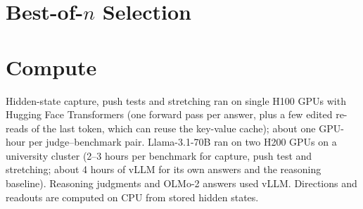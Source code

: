 \begin{table}[h]
\centering
\small

\caption{Same-model pairs on questions the judge cannot solve, per judge: ranking ($\times$100) by each readout. Groups: questions with at least one right and one wrong answer from the same answering model.}
\label{tab:smpairs}
\end{table}

\section{Best-of-$n$ Selection}
\label{app:bon}

\begin{table}[h]
\centering
\small

\caption{Best-of-$n$ accuracy: the share of groups (questions; question $\times$ answering model for same-model sets; only groups with at least one right and one wrong answer) in which the top-scored answer is right, for random choice and the forced verdict, and the gain of each readout over the verdict (pooled over judges; bold: 95\% interval above 0).}
\label{tab:bon}
\end{table}

\section{Compute}

Hidden-state capture, push tests and stretching ran on single H100 GPUs with Hugging Face Transformers (one forward pass per answer, plus a few edited re-reads of the last token, which can reuse the key-value cache); about one GPU-hour per judge--benchmark pair. Llama-3.1-70B ran on two H200 GPUs on a university cluster (2--3 hours per benchmark for capture, push test and stretching; about 4 hours of vLLM for its own answers and the reasoning baseline). Reasoning judgments and OLMo-2 answers used vLLM. Directions and readouts are computed on CPU from stored hidden states.
